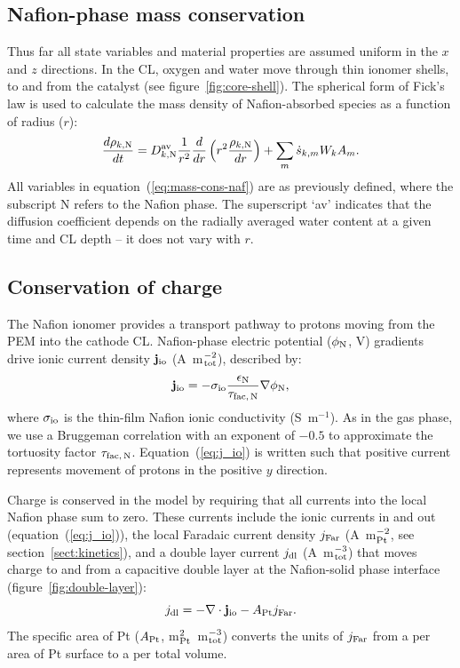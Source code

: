 \documentclass[final,3p,times,twocolumn]{elsarticle}    %
\begin{document}
\subsection{Nafion-phase mass conservation}
Thus far all state variables and material properties are assumed uniform in the $x$ and $z$ directions. In the CL, 
oxygen and water move through thin ionomer shells, to and from the catalyst (see figure~\ref{fig:core-shell}). The spherical form of Fick's law is used to calculate the mass density of Nafion-absorbed species as a function of radius ($r$):
\begin{equation} \label{eq:mass-cons-naf}
    \frac{d \rho_{k,\rm N}}{d t} = D_{k,\rm N}^{\rm av}
    \frac{1}{r^2} \frac{d}{d r} \left( r^2 \frac{\rho_{k,\rm N}}{dr} \right) 
    + \sum_m \dot{s}_{k,m} W_k A_m.
\end{equation}
All variables in equation~(\ref{eq:mass-cons-naf}) are as previously defined, where the subscript N refers to the Nafion phase. The superscript `av' indicates that the diffusion coefficient depends on the radially averaged water content at a given time and CL depth -- it does not vary with $r$.

\subsection{Conservation of charge}
The Nafion ionomer provides a transport pathway to protons moving from the PEM into the cathode CL. Nafion-phase electric potential ($\phi_{\rm N}$, V) gradients drive ionic current density ${\bf j}_{\rm io}$ (A~m$^{-2}_{\rm tot}$), described by:
\begin{equation} \label{eq:j_io}
    {\bf j}_{\rm io} = - \sigma_{\rm io} \frac{\epsilon_{\rm N}}{\tau_{\rm fac,\,N}} \nabla \phi_{\rm N},
\end{equation}
where $\sigma_{\rm io}$ is the thin-film Nafion ionic conductivity (S~m$^{-1}$). As in the gas phase, we use a Bruggeman correlation with an exponent of $-0.5$ to approximate the tortuosity factor $\tau_{\rm fac,\,N}$. Equation~(\ref{eq:j_io}) is written such that positive current represents movement of protons in the positive $y$ direction.

Charge is conserved in the model by requiring that all currents into the local Nafion phase sum to zero. These currents include the ionic currents in and out (equation~(\ref{eq:j_io})), the local Faradaic current density $j_{\rm Far}$ (A~m$^{-2}_{\rm Pt}$, see section~\ref{sect:kinetics}), and a double layer current $j_{\rm dl}$ (A~m$^{-3}_{\rm tot}$) that moves charge to and from a capacitive double layer at the Nafion-solid phase interface (figure~\ref{fig:double-layer}):
\begin{equation} \label{eq:double-layer}
    j_{\rm dl} = - \nabla \cdot {\bf j}_{\rm io} - A_{\rm Pt} j_{\rm Far}.
\end{equation}
The specific area of Pt ($A_{\rm Pt}$, m$^2_{\rm Pt}$~m$^{-3}_{\rm tot}$) converts the units of $j_{\rm Far}$ from a per area of Pt surface to a per total volume. 
\end{document}

